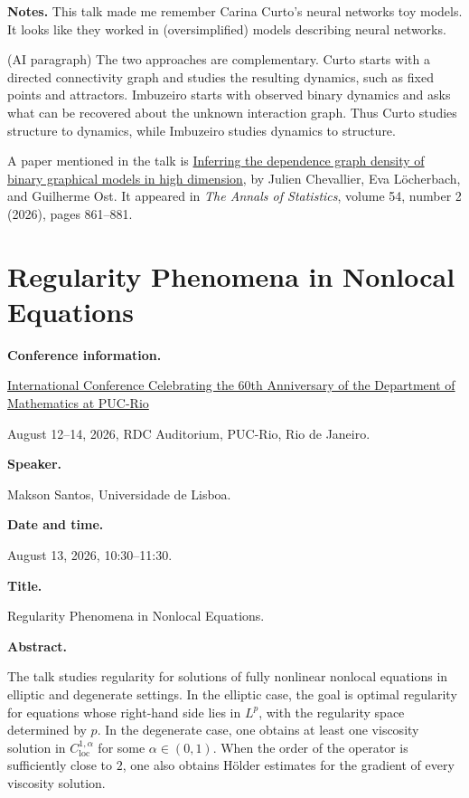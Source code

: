 \medskip\noindent
{\bf Notes.}
This talk made me remember Carina Curto's
neural networks toy models. It looks
like they worked in (oversimplified)
models describing neural networks.

(AI paragraph)
The two approaches are complementary.
Curto starts with a directed connectivity
graph and studies the resulting dynamics,
such as fixed points and attractors.
Imbuzeiro starts with observed binary
dynamics and asks what can be recovered
about the unknown interaction graph. Thus
Curto studies structure to dynamics, while
Imbuzeiro studies dynamics to structure.


A paper mentioned in the talk is
\href{%
https://doi.org/10.1214/25-AOS2592
}{Inferring the dependence graph density
of binary graphical models in high
dimension}, by Julien Chevallier,
Eva L\"ocherbach, and Guilherme Ost. It
appeared in \emph{The Annals of
Statistics}, volume 54, number 2 (2026),
pages 861--881.

\section{Regularity Phenomena in
Nonlocal Equations}
\label{section-regularity-nonlocal}

\medskip\noindent
{\bf Conference information.}

\href{%
https://sites.google.com/view/%
60thanniversary-dmat-puc-rio/Home
}{International Conference Celebrating
the 60th Anniversary of the Department
of Mathematics at PUC-Rio}

August 12--14, 2026,
RDC Auditorium, PUC-Rio,
Rio de Janeiro.

\medskip\noindent
{\bf Speaker.}

Makson Santos,
Universidade de Lisboa.

\medskip\noindent
{\bf Date and time.}

August 13, 2026, 10:30--11:30.

\medskip\noindent
{\bf Title.}

Regularity Phenomena in Nonlocal
Equations.

\medskip\noindent
{\bf Abstract.}

The talk studies regularity for solutions
of fully nonlinear nonlocal equations in
elliptic and degenerate settings. In the
elliptic case, the goal is optimal
regularity for equations whose right-hand
side lies in $L^p$, with the regularity
space determined by $p$. In the degenerate
case, one obtains at least one viscosity
solution in
$C^{1,\alpha}_{\mathrm{loc}}$ for some
$\alpha\in(0,1)$. When the order of the
operator is sufficiently close to $2$,
one also obtains H\"older estimates for
the gradient of every viscosity solution.

